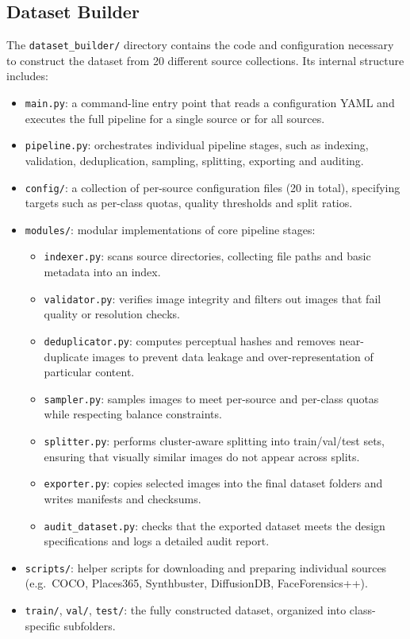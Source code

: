 \subsection{Dataset Builder}

The \texttt{dataset\_builder/} directory contains the code and configuration necessary to construct the dataset from 20 different source collections. Its internal structure includes:
\begin{itemize}
  \item \texttt{main.py}: a command-line entry point that reads a configuration YAML and executes the full pipeline for a single source or for all sources.
  \item \texttt{pipeline.py}: orchestrates individual pipeline stages, such as indexing, validation, deduplication, sampling, splitting, exporting and auditing.
  \item \texttt{config/}: a collection of per-source configuration files (20 in total), specifying targets such as per-class quotas, quality thresholds and split ratios.
  \item \texttt{modules/}: modular implementations of core pipeline stages:
  \begin{itemize}
    \item \texttt{indexer.py}: scans source directories, collecting file paths and basic metadata into an index.
    \item \texttt{validator.py}: verifies image integrity and filters out images that fail quality or resolution checks.
    \item \texttt{deduplicator.py}: computes perceptual hashes and removes near-duplicate images to prevent data leakage and over-representation of particular content.
    \item \texttt{sampler.py}: samples images to meet per-source and per-class quotas while respecting balance constraints.
    \item \texttt{splitter.py}: performs cluster-aware splitting into train/val/test sets, ensuring that visually similar images do not appear across splits.
    \item \texttt{exporter.py}: copies selected images into the final dataset folders and writes manifests and checksums.
    \item \texttt{audit\_dataset.py}: checks that the exported dataset meets the design specifications and logs a detailed audit report.
  \end{itemize}
  \item \texttt{scripts/}: helper scripts for downloading and preparing individual sources (e.g.\ COCO, Places365, Synthbuster, DiffusionDB, FaceForensics++).
  \item \texttt{train/}, \texttt{val/}, \texttt{test/}: the fully constructed dataset, organized into class-specific subfolders.
\end{itemize}

